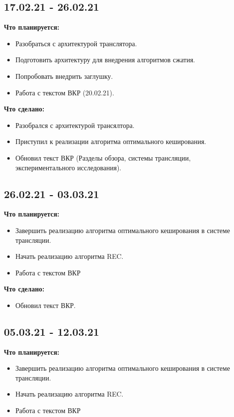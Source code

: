 \documentclass[a4peper, 12pt, titlepage, finall]{extreport}
\begin{document}
        \subsection{17.02.21 - 26.02.21}
            {\bf Что планируется:}
            \begin{itemize}
                \item Разобраться с архитектурой транслятора.
                \item Подготовить архитектуру для внедрения алгоритмов сжатия.
                \item Попробовать внедрить заглушку.
                \item Работа с текстом ВКР (20.02.21).
            \end{itemize}
            {\bf Что сделано:}
            \begin{itemize}
                \item Разобрался с архитектурой трансялтора.
                \item Приступил к реализации алгоритма оптимального кеширования.
                \item Обновил текст ВКР (Разделы обзора, системы трансляции, экспериментального исследования).
            \end{itemize}
        \subsection{26.02.21 - 03.03.21}
            {\bf Что планируется:}
            \begin{itemize}
                \item Завершить реализацию алгоритма оптимального кеширования в системе трансляции.
                \item Начать реализацию алгоритма REC.
                \item Работа с текстом ВКР
            \end{itemize}
           {\bf Что сделано:}
            \begin{itemize}
                \item Обновил текст ВКР.
            \end{itemize}
        \subsection{05.03.21 - 12.03.21}
            {\bf Что планируется:}
            \begin{itemize}
                \item Завершить реализацию алгоритма оптимального кеширования в системе трансляции.
                \item Начать реализацию алгоритма REC.
                \item Работа с текстом ВКР
            \end{itemize}
\end{document}
